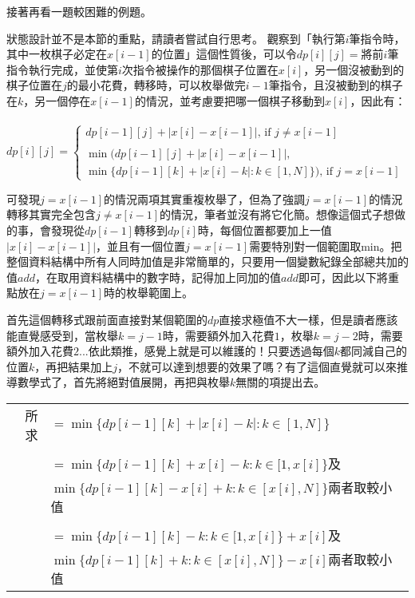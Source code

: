 接著再看一題較困難的例題。

狀態設計並不是本節的重點，請讀者嘗試自行思考。
觀察到「執行第$i$筆指令時，其中一枚棋子必定在$x[i - 1]$的位置」這個性質後，可以令$dp[i][j] = $將前$i$筆指令執行完成，並使第$i$次指令被操作的那個棋子位置在$x[i]$，另一個沒被動到的棋子位置在$j$的最小花費，轉移時，可以枚舉做完$i-1$筆指令，且沒被動到的棋子在$k$，另一個停在$x[i - 1]$的情況，並考慮要把哪一個棋子移動到$x[i]$，因此有：\\ \\
$dp[i][j] =
\begin{cases}
dp[i - 1][j] + \left|x[i] - x[i - 1]\right|  \mbox{, if } j \neq x[i - 1]\\ \\
\min(dp[i - 1][j] + \left|x[i] - x[i - 1]\right|, \\ \min\{dp[i - 1][k] + \left|x[i] - k\right| : k \in [1, N]\}) \mbox{, if } j = x[i - 1]
\end{cases}$

可發現$j = x[i - 1]$的情況兩項其實重複枚舉了，但為了強調$j = x[i - 1]$的情況轉移其實完全包含$j \neq x[i - 1]$的情況，筆者並沒有將它化簡。想像這個式子想做的事，會發現從$dp[i - 1]$轉移到$dp[i]$時，每個位置都要加上一值$\left|x[i] - x[i - 1]\right|$，並且有一個位置$j = x[i - 1]$需要特別對一個範圍取min。把整個資料結構中所有人同時加值是非常簡單的，只要用一個變數紀錄全部總共加的值$add$，在取用資料結構中的數字時，記得加上同加的值$add$即可，因此以下將重點放在$j = x[i - 1]$時的枚舉範圍上。

首先這個轉移式跟前面直接對某個範圍的$dp$直接求極值不大一樣，但是讀者應該能直覺感受到，當枚舉$k = j - 1$時，需要額外加入花費$1$，枚舉$k = j - 2$時，需要額外加入花費$2$...依此類推，感覺上就是可以維護的！只要透過每個$k$都同減自己的位置$k$，再把結果加上$j$，不就可以達到想要的效果了嗎？有了這個直覺就可以來推導數學式了，首先將絕對值展開，再把與枚舉$k$無關的項提出去。

\begin{tabular}{rl}
所求&$ = \min\{dp[i - 1][k] + \left|x[i] - k\right| : k \in [1, N]\}$ \\ \\
    &$ = \min\{dp[i - 1][k] + x[i] - k : k \in [1, x[i]\}$及 \\
    &$\min\{dp[i - 1][k] - x[i] + k : k \in [x[i], N]\}$兩者取較小值 \\ \\
    &$ = \min\{dp[i - 1][k] - k : k \in [1, x[i]\} + x[i]$及 \\
    &$\min\{dp[i - 1][k] + k : k \in [x[i], N]\} - x[i]$兩者取較小值 \\
\end{tabular}

